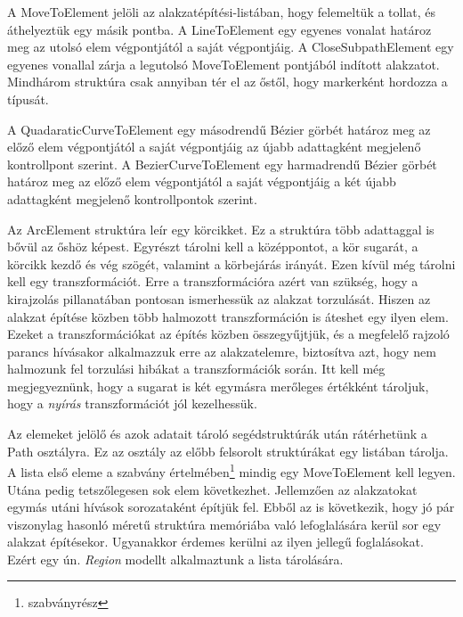 \documentclass[12pt]{report}
\theoremstyle{definition}
\newcommand{\func}[1]{{\textsf{\footnotesize{#1}}}}
\begin{document}
A \func{MoveToElement} jelöli az alakzatépítési-listában, hogy felemeltük a
tollat, és áthelyeztük egy másik pontba. A \func{LineToElement} egy egyenes
vonalat határoz meg az utolsó elem végpontjától a saját végpontjáig. A
\func{CloseSubpathElement} egy egyenes vonallal zárja a legutolsó
\func{MoveToElement} pontjából indított alakzatot. Mindhárom struktúra csak
annyiban tér el az őstől, hogy markerként hordozza a típusát.

A \func{QuadaraticCurveToElement} egy másodrendű Bézier görbét határoz meg az
előző elem végpontjától a saját végpontjáig az újabb adattagként megjelenő
kontrollpont szerint. A \func{BezierCurveToElement} egy harmadrendű
Bézier görbét határoz meg az előző elem végpontjától a saját végpontjáig a két
újabb adattagként megjelenő kontrollpontok szerint.

Az \func{ArcElement} struktúra leír egy körcikket. Ez a struktúra több
adattaggal is bővül az őshöz képest. Egyrészt tárolni kell a középpontot, a kör
sugarát, a körcikk kezdő és vég szögét, valamint a körbejárás irányát. Ezen
kívül még tárolni kell egy transzformációt. Erre a transzformációra azért van
szükség, hogy a kirajzolás pillanatában pontosan ismerhessük az alakzat
torzulását. Hiszen az alakzat építése közben több halmozott transzformáción is
áteshet egy ilyen elem. Ezeket a transzformációkat az építés közben
összegyűjtjük, és a megfelelő rajzoló parancs hívásakor alkalmazzuk erre az
alakzatelemre, biztosítva azt, hogy nem halmozunk fel torzulási hibákat a
transzformációk során. Itt kell még megjegyeznünk, hogy a sugarat is két
egymásra merőleges értékként tároljuk, hogy a \emph{nyírás} transzformációt jól
kezelhessük.

Az elemeket jelölő és azok adatait tároló segédstruktúrák után rátérhetünk a
\func{Path} osztályra. Ez az osztály az előbb felsorolt struktúrákat egy
listában tárolja. A lista első eleme a szabvány
értelmében\footnote{szabványrész} mindig egy \func{MoveToElement} kell legyen.
Utána pedig tetszőlegesen sok elem következhet. Jellemzően az alakzatokat
egymás utáni hívások sorozataként építjük fel. Ebből az is következik, hogy jó
pár viszonylag hasonló méretű struktúra memóriába való lefoglalására kerül sor
egy alakzat építésekor. Ugyanakkor érdemes kerülni az ilyen jellegű
foglalásokat. Ezért egy ún. \emph{Region} modellt alkalmaztunk a lista
tárolására.
\end{document}
